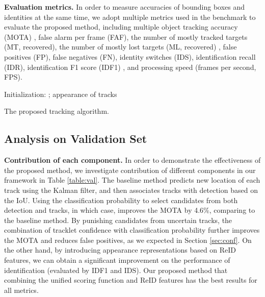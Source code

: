 \documentclass{article}
\begin{document}
\textbf{Evaluation metrics.}
In order to measure accuracies of bounding boxes and identities at the same time,
we adopt multiple metrics used in the benchmark to evaluate the proposed method, 
including multiple object tracking accuracy (MOTA) \cite{bernardin2008evaluating}, 
false alarm per frame (FAF), the number of
mostly tracked targets (MT,  recovered), the number of
mostly lost targets (ML,  recovered) \cite{li2009learning}, false positives (FP), false negatives (FN),
identity switches (IDS), identification recall (IDR), 
identification F1 score (IDF1) \cite{ristani2016performance}, and processing speed (frames per second, FPS).


\begin{algorithm}[t]
\SetAlgoLined
\DontPrintSemicolon
\SetNoFillComment
\footnotesize
{}

Initialization: ; appearance of tracks  \;
\caption{The proposed tracking algorithm.}
\end{algorithm}


\subsection{Analysis on Validation Set}
\label{sec:val}
\textbf{Contribution of each component.}
In order to demonstrate the effectiveness of the proposed method,
we investigate contribution of different components in our framework 
in Table \ref{table:val}.
The baseline method predicts new location of each track using the Kalman filter,
and then associates tracks with detection based on the IoU.
Using the classification probability to select candidates from both detection and tracks,
in which case, improves the MOTA by 4.6\%, comparing to the baseline method.
By punishing candidates from uncertain tracks,
the combination of tracklet confidence with classification probability
further improves the MOTA and reduces false positives,
as we expected in Section \ref{sec:conf}.
On the other hand, 
by introducing appearance representations based on ReID features,
we can obtain a significant improvement on the performance of identification (evaluated by IDF1 and IDS).
Our proposed method that combining the unified scoring function and ReID features 
has the best results for all metrics.
\end{document}
